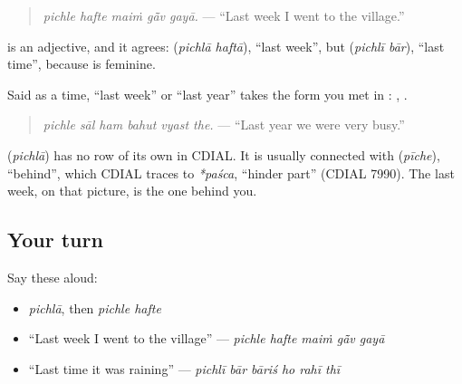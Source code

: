 \begin{quote}
\emph{pichle hafte maiṁ gā̃v gayā.} — \textquotedblleft{}Last week I went to the village.\textquotedblright{}
\end{quote}

\textbf{} is an adjective, and it agrees: \textbf{ } (\emph{pichlā haftā}), \textquotedblleft{}last week\textquotedblright{}, but \textbf{ } (\emph{pichlī bār}), \textquotedblleft{}last time\textquotedblright{}, because \textbf{} is feminine.

Said as a time, \textquotedblleft{}last week\textquotedblright{} or \textquotedblleft{}last year\textquotedblright{} takes the form you met in \textbf{ }: \textbf{ }, \textbf{ }.

\begin{quote}
\textbf{     }
\end{quote}

\begin{quote}
\emph{pichle sāl ham bahut vyast the.} — \textquotedblleft{}Last year we were very busy.\textquotedblright{}
\end{quote}

\begin{cousinweb}
\textbf{} (\emph{pichlā}) has no row of its own in CDIAL. It is usually connected with \textbf{} (\emph{pīche}), \textquotedblleft{}behind\textquotedblright{}, which CDIAL traces to \emph{*paśca}, \textquotedblleft{}hinder part\textquotedblright{} (CDIAL 7990). The last week, on that picture, is the one behind you.
\end{cousinweb}

\subsection*{Your turn}
Say these aloud:

\begin{itemize}
\raggedright
  \item \emph{pichlā}, then \emph{pichle hafte}
  \item \textquotedblleft{}Last week I went to the village\textquotedblright{} — \emph{pichle hafte maiṁ gā̃v gayā}
  \item \textquotedblleft{}Last time it was raining\textquotedblright{} — \emph{pichlī bār bāriś ho rahī thī}
\end{itemize}

